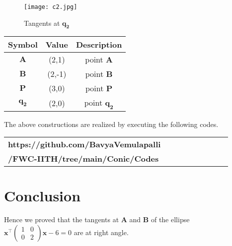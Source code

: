 \documentclass[journal,10pt,twocolumn]{article}
\let\vec\mathbf
\newcommand{\myvec}[1]{\ensuremath{\begin{pmatrix}#1\end{pmatrix}}}
\begin{document}
\begin{figure}[H]
    \centering
    \texttt{[image: c2.jpg]}
    \caption{Tangents at $\vec{q_2}$}
    \label{fig:Bisector}
\end{figure}

\begin{table}[h]
	\centering
\setlength\extrarowheight{2pt}
	\begin{tabular}{|c|c|c|}
		\hline
		\textbf{Symbol} & \textbf{Value} & \textbf{Description} \\
		\hline
		$\vec{A}$ & (2,1) & point $\vec{A}$\\
		\hline
		$\vec{B}$ & (2,-1) & point $\vec{B}$\\
		\hline
		$\vec{P}$ & (3,0) & point $\vec{P}$\\
		\hline
		$\vec{q_2}$ & (2,0) & point $\vec{q_2}$\\
		\hline
	\end{tabular}
\end{table}

    The above constructions are realized by executing the following codes.
    
\begin{table}[H]
\begin{tabular}{|l|c|c|c|c|c|c|c|c}\hline\textbf{https://github.com/BavyaVemulapalli}\\
    \textbf{/FWC-IITH/tree/main/Conic/Codes} \\ \hline
\end{tabular}
\end{table}

\section{Conclusion}

    \begin{flushleft}
        Hence we proved that the tangents at $\vec{A}$ and $\vec{B}$ of the ellipse $\vec{x^\top}\myvec{1 & 0 \\ 0 & 2}\vec{x} - 6 = 0$ are at right angle.
    \end{flushleft}
\end{document}
